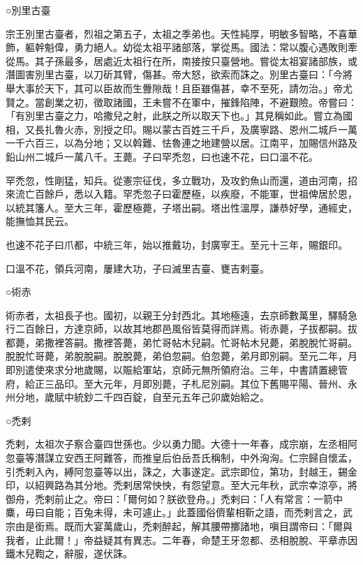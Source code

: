 
\begin{pinyinscope}

 ○別里古臺



 宗王別里古臺者，烈祖之第五子，太祖之季弟也。天性純厚，明敏多智略，不喜華飾，軀幹魁偉，勇力絕人。幼從太祖平諸部落，掌從馬。國法：常以腹心遇敗則牽從馬。其子孫最多，居處近太祖行在所，南接按只臺營地。嘗從太祖宴諸部族，或潛圖害別里古臺，以刀斫其臂，傷甚。帝大怒，欲索而誅之。別里古臺曰：「今將舉大事於天下，其可以臣故而生釁隙哉！且臣雖傷甚，幸不至死，請勿治。」帝尤賢之。當創業之初，徵取諸國，王未嘗不在軍中，摧鋒陷陣，不避艱險。帝嘗曰：「有別里古臺之力，哈撒兒之射，此朕之所以取天下也。」其見稱如此。嘗立為國相，又長扎魯火赤，別授之印。賜以蒙古百姓三千戶，及廣寧路、恩州二城戶一萬一千六百三，以為分地；又以斡難、怯魯連之地建營以居。江南平，加賜信州路及鉛山州二城戶一萬八千。王薨。子曰罕禿忽，曰也速不花，曰口溫不花。



 罕禿忽，性剛猛，知兵。從憲宗征伐，多立戰功，及攻釣魚山而還，道由河南，招來流亡百餘戶，悉以入籍。罕禿忽子曰霍歷極，以疾廢，不能軍，世祖俾居於恩，以統其籓人。至大三年，霍歷極薨，子塔出嗣。塔出性溫厚，謙恭好學，通經史，能撫恤其民云。



 也速不花子曰爪都，中統三年，始以推戴功，封廣寧王。至元十三年，賜銀印。



 口溫不花，領兵河南，屢建大功，子曰滅里吉臺、甕吉剌臺。



 ○術赤



 術赤者，太祖長子也。國初，以親王分封西北。其地極遠，去京師數萬里，驛騎急行二百餘日，方達京師，以故其地郡邑風俗皆莫得而詳焉。術赤薨，子拔都嗣。拔都薨，弟撒裡答嗣。撒裡答薨，弟忙哥帖木兒嗣。忙哥帖木兒薨，弟脫脫忙哥嗣。脫脫忙哥薨，弟脫脫嗣。脫脫薨，弟伯忽嗣。伯忽薨，弟月即別嗣。至元二年，月即別遣使來求分地歲賜，以賑給軍站，京師元無所領府治。三年，中書請置總管府，給正三品印。至大元年，月即別薨，子札尼別嗣。其位下舊賜平陽、晉州、永州分地，歲賦中統鈔二千四百錠，自至元五年己卯歲始給之。



 ○禿剌



 禿剌，太祖次子察合臺四世孫也。少以勇力聞。大德十一年春，成宗崩，左丞相阿忽臺等潛謀立安西王阿難答，而推皇后伯岳吾氏稱制，中外洶洶。仁宗歸自懷孟，引禿剌入內，縛阿忽臺等以出，誅之，大事遂定。武宗即位，第功，封越王，錫金印，以紹興路為其分地。禿剌居常怏怏，有怨望意。至大元年秋，武宗幸涼亭，將御舟，禿剌前止之。帝曰：「爾何如？朕欲登舟。」禿剌曰：「人有常言：一箭中麋，毋曰自能；百兔未得，未可遽止。」此蓋國俗儕輩相靳之語，而禿剌言之，武宗由是銜焉。既而大宴萬歲山，禿剌醉起，解其腰帶擲諸地，嗔目謂帝曰：「爾與我者，止此爾！」帝益疑其有異志。二年春，命楚王牙忽都、丞相脫脫、平章赤因鐵木兒鞫之，辭服，遂伏誅。




\end{pinyinscope}
